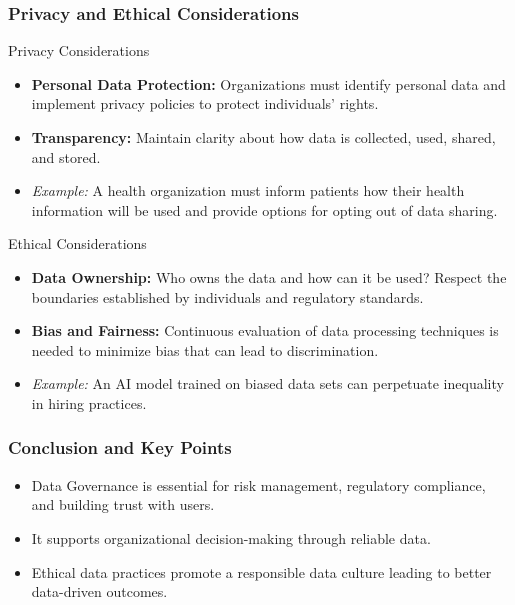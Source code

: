 \documentclass[aspectratio=169]{beamer}
\begin{document}
\begin{frame}[fragile]
    \frametitle{Privacy and Ethical Considerations}
    \begin{block}{Privacy Considerations}
        \begin{itemize}
            \item \textbf{Personal Data Protection:} Organizations must identify personal data and implement privacy policies to protect individuals’ rights.
            \item \textbf{Transparency:} Maintain clarity about how data is collected, used, shared, and stored.
            \item \textit{Example:} A health organization must inform patients how their health information will be used and provide options for opting out of data sharing.
        \end{itemize}
    \end{block}
    
    \begin{block}{Ethical Considerations}
        \begin{itemize}
            \item \textbf{Data Ownership:} Who owns the data and how can it be used? Respect the boundaries established by individuals and regulatory standards.
            \item \textbf{Bias and Fairness:} Continuous evaluation of data processing techniques is needed to minimize bias that can lead to discrimination.
            \item \textit{Example:} An AI model trained on biased data sets can perpetuate inequality in hiring practices.
        \end{itemize}
    \end{block}
\end{frame}

\begin{frame}[fragile]
    \frametitle{Conclusion and Key Points}
    \begin{itemize}
        \item Data Governance is essential for risk management, regulatory compliance, and building trust with users.
        \item It supports organizational decision-making through reliable data.
        \item Ethical data practices promote a responsible data culture leading to better data-driven outcomes.
    \end{itemize}
\end{frame}
\end{document}

